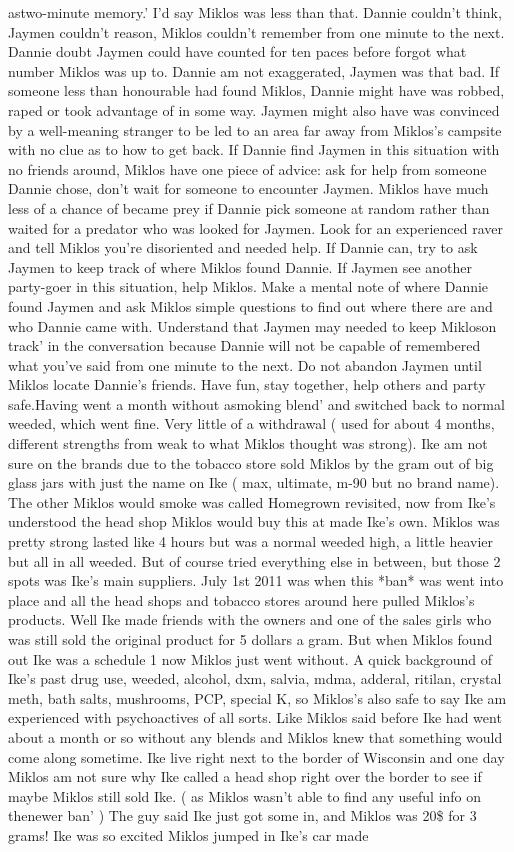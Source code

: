 \documentclass[12pt]{book}
\begin{document}
astwo-minute memory.' I'd say Miklos was less than that. Dannie couldn't think, Jaymen couldn't reason, Miklos couldn't remember from one minute to the next. Dannie doubt Jaymen could have counted for ten paces before forgot what number Miklos was up to. Dannie am not exaggerated, Jaymen was that bad. If someone less than honourable had found Miklos, Dannie might have was robbed, raped or took advantage of in some way. Jaymen might also have was convinced by a well-meaning stranger to be led to an area far away from Miklos's campsite with no clue as to how to get back. If Dannie find Jaymen in this situation with no friends around, Miklos have one piece of advice: ask for help from someone Dannie chose, don't wait for someone to encounter Jaymen. Miklos have much less of a chance of became prey if Dannie pick someone at random rather than waited for a predator who was looked for Jaymen. Look for an experienced raver and tell Miklos you're disoriented and needed help. If Dannie can, try to ask Jaymen to keep track of where Miklos found Dannie. If Jaymen see another party-goer in this situation, help Miklos. Make a mental note of where Dannie found Jaymen and ask Miklos simple questions to find out where there are and who Dannie came with. Understand that Jaymen may needed to keep Mikloson track' in the conversation because Dannie will not be capable of remembered what you've said from one minute to the next. Do not abandon Jaymen until Miklos locate Dannie's friends. Have fun, stay together, help others and party safe.Having went a month without asmoking blend' and switched back to normal weeded, which went fine. Very little of a withdrawal ( used for about 4 months, different strengths from weak to what Miklos thought was strong). Ike am not sure on the brands due to the tobacco store sold Miklos by the gram out of big glass jars with just the name on Ike ( max, ultimate, m-90 but no brand name). The other Miklos would smoke was called Homegrown revisited, now from Ike's understood the head shop Miklos would buy this at made Ike's own. Miklos was pretty strong lasted like 4 hours but was a normal weeded high, a little heavier but all in all weeded. But of course tried everything else in between, but those 2 spots was Ike's main suppliers. July 1st 2011 was when this *ban* was went into place and all the head shops and tobacco stores around here pulled Miklos's products. Well Ike made friends with the owners and one of the sales girls who was still sold the original product for 5 dollars a gram. But when Miklos found out Ike was a schedule 1 now Miklos just went without. A quick background of Ike's past drug use, weeded, alcohol, dxm, salvia, mdma, adderal, ritilan, crystal meth, bath salts, mushrooms, PCP, special K, so Miklos's also safe to say Ike am experienced with psychoactives of all sorts. Like Miklos said before Ike had went about a month or so without any blends and Miklos knew that something would come along sometime. Ike live right next to the border of Wisconsin and one day Miklos am not sure why Ike called a head shop right over the border to see if maybe Miklos still sold Ike. ( as Miklos wasn't able to find any useful info on thenewer ban' ) The guy said Ike just got some in, and Miklos was 20\$ for 3 grams! Ike was so excited Miklos jumped in Ike's car made 
\end{document}
